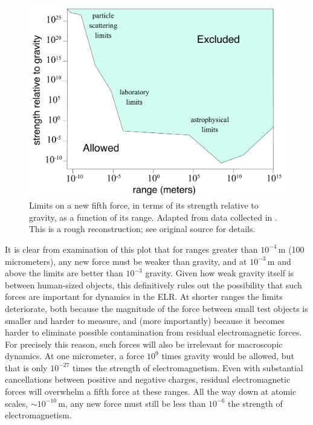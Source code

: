 \documentclass[12pt,letterpaper]{article}
\begin{document}
\begin{figure}[h]
\centering
\includegraphics[width=.8\textwidth, valign=c]{fifth-force-limits-2}
\caption{\small Limits on a new fifth force, in terms of its strength relative to gravity, as a function of its range. 
Adapted from data collected in \citep{ADELBERGER2009102}.
This is a rough reconstruction; see original source for details.}
\label{fig:fifth-force}
\end{figure}

It is clear from examination of this plot that for ranges greater than $10^{-4}$\,m (100 micrometers), any new force must be weaker than gravity, and at $10^{-3}$\,m and above the limits are better than $10^{-3}$ gravity.
Given how weak gravity itself is between human-sized objects, this definitively rules out the possibility that such forces are important for dynamics in the ELR.
At shorter ranges the limits deteriorate, both because the magnitude of the force between small test objects is smaller and harder to measure, and (more importantly) because it becomes harder to eliminate possible contamination from residual electromagnetic forces.
For precisely this reason, such forces will also be irrelevant for macroscopic dynamics.
At one micrometer, a force $10^9$ times gravity would be allowed, but that is only $10^{-27}$ times the strength of electromagnetism.
Even with substantial cancellations between positive and negative charges, residual electromagnetic forces will overwhelm a fifth force at these ranges.
All the way down at atomic scales, $\sim 10^{-10}$\,m, any new force must still be less than $10^{-6}$ the strength of electromagnetism.
\end{document}

